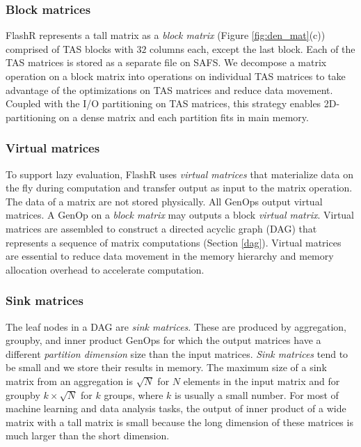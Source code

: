 \subsubsection{Block matrices} \label{sec:block_mat}
FlashR represents a tall matrix as a \textit{block matrix} 
(Figure \ref{fig:den_mat}(c)) comprised of TAS blocks with $32$ columns each,
except the last block. 
Each of the TAS matrices is stored as a separate file on SAFS. 
We decompose a matrix operation
on a block matrix into operations on individual TAS matrices to take advantage
of the optimizations on TAS matrices and reduce data movement.
Coupled with the I/O partitioning on TAS matrices, this strategy enables
2D-partitioning on a dense matrix and each partition fits in main memory.


\subsubsection{Virtual matrices} \label{virt_mat}
To support lazy evaluation, FlashR uses \textit{virtual matrices} that
materialize data on the fly during computation and transfer output as input to
the matrix operation. The data of a matrix are not stored physically.
All GenOps output virtual matrices. A GenOp on a \textit{block matrix} may outputs
a block \textit{virtual matrix}. Virtual matrices are assembled to construct
a directed acyclic graph (DAG) that represents a sequence of matrix computations
(Section \ref{dag}). Virtual matrices are essential to reduce data
movement in the memory hierarchy and memory allocation overhead to accelerate
computation.

\subsubsection{Sink matrices}
The leaf nodes in a DAG are \textit{sink matrices}.
These are produced by aggregation, groupby, and inner product GenOps for which 
the output matrices have a different \textit{partition dimension} size than
the input matrices. \textit{Sink matrices} tend to be small and we store their
results in memory. The maximum size of a sink matrix from an aggregation
is $\sqrt{N}$ for $N$ elements in the input matrix and for groupby
$k \times \sqrt{N}$ for $k$ groups, where $k$ is usually a small number.
For most of machine learning and data analysis tasks, the output of inner product
of a wide matrix with a tall matrix is small because
the long dimension of these matrices is much larger than the short dimension.

